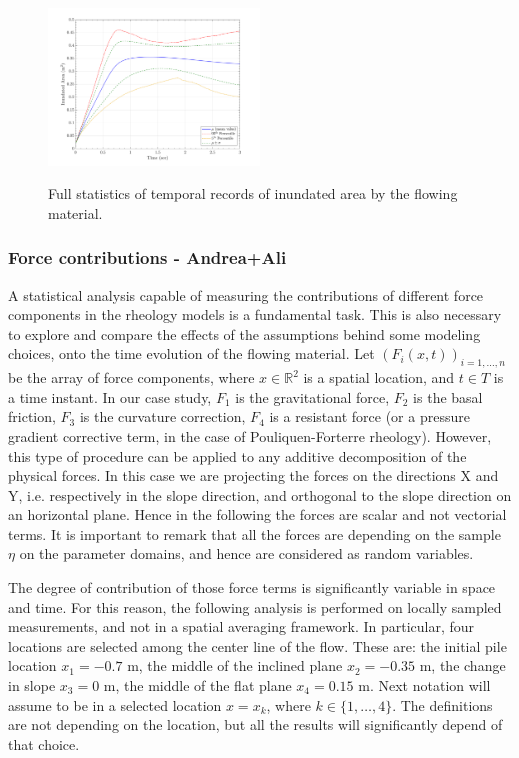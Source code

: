 \documentclass{article}
\begin{document}
\begin{figure}[H]
        \begin{minipage}[b]{1\linewidth}
                \centering
                \includegraphics[width=0.5\textwidth]{InclinedPlane/GlobalRecords/V_Global_Ar.png}
                \label{fig:Ramp-SP-InundAr-V}
        \end{minipage}
        \caption{Full statistics of temporal records of inundated area by the flowing material.}
        \label{fig:Ramp-SP-InundAr}
\end{figure}

\subsubsection{Force contributions - Andrea+Ali}
A statistical analysis capable of measuring the contributions of different force components in the rheology models is a fundamental task. This is also necessary to explore and compare the effects of the assumptions behind some modeling choices, onto the time evolution of the flowing material. Let $(F_i(x,t))_{i=1,\dots, n}$ be the array of force components, where $x\in\mathbb R^2$ is a spatial location, and $t\in T$ is a time instant. In our case study, $F_1$ is the gravitational force, $F_2$ is the basal friction, $F_3$ is the curvature correction, $F_4$ is a resistant force (or a pressure gradient corrective term, in the case of Pouliquen-Forterre rheology). However, this type of procedure can be applied to any additive decomposition of the physical forces. In this case we are projecting the forces on the directions X and Y, i.e. respectively in the slope direction, and orthogonal to the slope direction on an horizontal plane. Hence in the following the forces are scalar and not vectorial terms. It is important to remark that all the forces are depending on the sample $\eta$ on the parameter domains, and hence are considered as random variables.

The degree of contribution of those force terms is significantly variable in space and time. For this reason, the following analysis is performed on locally sampled measurements, and not in a spatial averaging framework. In particular, four locations are selected among the center line of the flow. These are: the initial pile location $x_1=-0.7$ m, the middle of the inclined plane $x_2=-0.35$ m, the change in slope $x_3=0$ m, the middle of the flat plane $x_4=0.15$ m. Next notation will assume to be in a selected location $x=x_k$, where $k\in\{1,\dots, 4\}$. The definitions are not depending on the location, but all the results will significantly depend of that choice.
\end{document}

